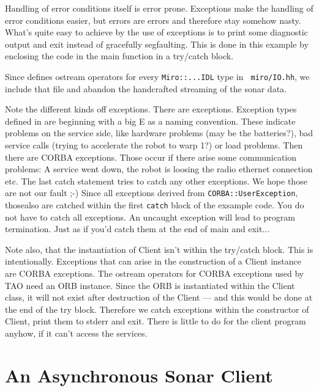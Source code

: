 Handling of error conditions itself is error prone. Exceptions make
the handling of error conditions easier, but errors are errors and
therefore stay somehow nasty. What's quite easy to achieve by the use
of exceptions is to print some diagnostic output and exit instead of
gracefully segfaulting. This is done in this example by enclosing the
code in the main function in a try/catch block.

Since \miro defines ostream operators for every \lstinline!Miro::...IDL!
type in \lstinline! miro/IO.hh!, we include that file and abandon the
handcrafted streaming of the sonar data.

Note the different kinds off exceptions. There are \miro exceptions.
Exception types defined in \miro are beginning with a big E as a
naming convention. These indicate problems on the service side, like
hardware problems (may be the batteries?), bad service calls (trying
to accelerate the robot to warp 1?) or load problems. Then there are
CORBA exceptions. Those occur if there arise some communication
problems: A service went down, the robot is loosing the radio ethernet
connection etc. The last catch statement tries to catch any other
exceptions. We hope those are not our fault ;-) Since all \miro
exceptions derived from \lstinline!CORBA::UserException!, thosealso
are catched within the first \lstinline!catch! block of the exsample
code. You do not have to catch all exceptions. An uncaught exception
will lead to program termination. Just as if you'd catch them at the
end of main and exit...

Note also, that the instantiation of Client isn't within the try/catch
block. This is intentionally. Exceptions that can arise in the
construction of a Client instance are CORBA exceptions. The ostream
operators for CORBA exceptions used by TAO need an ORB
instance. Since the ORB is instantiated within the Client class, it
will not exist after destruction of the Client --- and this would be
done at the end of the try block. Therefore we catch exceptions within
the constructor of Client, print them to stderr and exit. There is
little to do for the client program anyhow, if it can't access the
services. 



\section{An Asynchronous Sonar Client}
\label{sec:notify}

